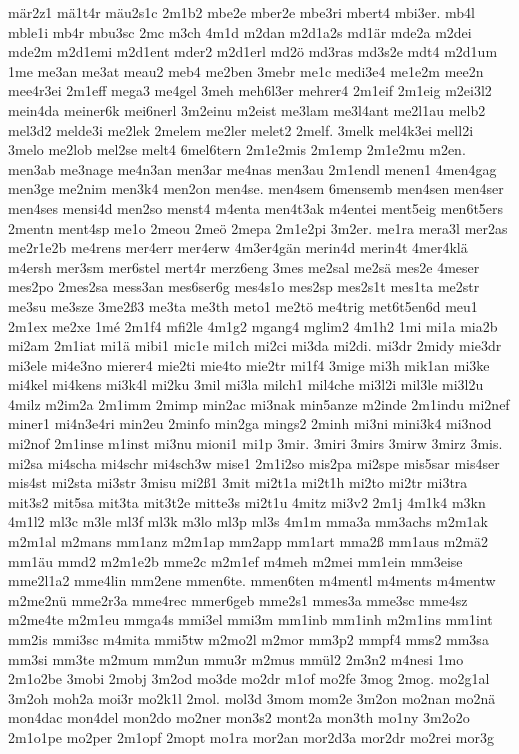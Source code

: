 {mär2z1
mä1t4r
mäu2s1c
2m1b2
mbe2e
mber2e
mbe3ri
mbert4
mbi3er.
mb4l
mble1i
mb4r
mbu3sc
2mc
m3ch
4m1d
m2dan
m2d1a2s
md1är
mde2a
m2dei
mde2m
m2d1emi
m2d1ent
mder2
m2d1erl
md2ö
md3ras
md3s2e
mdt4
m2d1um
1me
me3an
me3at
meau2
meb4
me2ben
3mebr
me1c
medi3e4
me1e2m
mee2n
mee4r3ei
2m1eff
mega3
me4gel
3meh
meh6l3er
mehrer4
2m1eif
2m1eig
m2ei3l2
mein4da
meiner6k
mei6nerl
3m2einu
m2eist
me3lam
me3l4ant
me2l1au
melb2
mel3d2
melde3i
me2lek
2melem
me2ler
melet2
2melf.
3melk
mel4k3ei
mell2i
3melo
me2lob
mel2se
melt4
6mel6tern
2m1e2mis
2m1emp
2m1e2mu
m2en.
men3ab
me3nage
me4n3an
men3ar
me4nas
men3au
2m1endl
menen1
4men4gag
men3ge
me2nim
men3k4
men2on
men4se.
men4sem
6mensemb
men4sen
men4ser
men4ses
mensi4d
men2so
menst4
m4enta
men4t3ak
m4entei
ment5eig
men6t5ers
2mentn
ment4sp
me1o
2meou
2meö
2mepa
2m1e2pi
3m2er.
me1ra
mera3l
mer2as
me2r1e2b
me4rens
mer4err
mer4erw
4m3er4gän
merin4d
merin4t
4mer4klä
m4ersh
mer3sm
mer6stel
mert4r
merz6eng
3mes
me2sal
me2sä
mes2e
4meser
mes2po
2mes2sa
mess3an
mes6ser6g
mes4s1o
mes2sp
mes2s1t
mes1ta
me2str
me3su
me3sze
3me2ß3
me3ta
me3th
meto1
me2tö
me4trig
met6t5en6d
meu1
2m1ex
me2xe
1mé
2m1f4
mfi2le
4m1g2
mgang4
mglim2
4m1h2
1mi
mi1a
mia2b
mi2am
2m1iat
mi1ä
mibi1
mic1e
mi1ch
mi2ci
mi3da
mi2di.
mi3dr
2midy
mie3dr
mi3ele
mi4e3no
mierer4
mie2ti
mie4to
mie2tr
mi1f4
3mige
mi3h
mik1an
mi3ke
mi4kel
mi4kens
mi3k4l
mi2ku
3mil
mi3la
milch1
mil4che
mi3l2i
mil3le
mi3l2u
4milz
m2im2a
2m1imm
2mimp
min2ac
mi3nak
min5anze
m2inde
2m1indu
mi2nef
miner1
mi4n3e4ri
min2eu
2minfo
min2ga
mings2
2minh
mi3ni
mini3k4
mi3nod
mi2nof
2m1inse
m1inst
mi3nu
mioni1
mi1p
3mir.
3miri
3mirs
3mirw
3mirz
3mis.
mi2sa
mi4scha
mi4schr
mi4sch3w
mise1
2m1i2so
mis2pa
mi2spe
mis5sar
mis4ser
mis4st
mi2sta
mi3str
3misu
mi2ß1
3mit
mi2t1a
mi2t1h
mi2to
mi2tr
mi3tra
mit3s2
mit5sa
mit3ta
mit3t2e
mitte3s
mi2t1u
4mitz
mi3v2
2m1j
4m1k4
m3kn
4m1l2
ml3c
m3le
ml3f
ml3k
m3lo
ml3p
ml3s
4m1m
mma3a
mm3achs
m2m1ak
m2m1al
m2mans
mm1anz
m2m1ap
mm2app
mm1art
mma2ß
mm1aus
m2mä2
mm1äu
mmd2
m2m1e2b
mme2c
m2m1ef
m4meh
m2mei
mm1ein
mm3eise
mme2l1a2
mme4lin
mm2ene
mmen6te.
mmen6ten
m4mentl
m4ments
m4mentw
m2me2nü
mme2r3a
mme4rec
mmer6geb
mme2s1
mmes3a
mme3sc
mme4sz
m2me4te
m2m1eu
mmga4s
mmi3el
mmi3m
mm1inb
mm1inh
m2m1ins
mm1int
mm2is
mmi3sc
m4mita
mmi5tw
m2mo2l
m2mor
mm3p2
mmpf4
mms2
mm3sa
mm3si
mm3te
m2mum
mm2un
mmu3r
m2mus
mmül2
2m3n2
m4nesi
1mo
2m1o2be
3mobi
2mobj
3m2od
mo3de
mo2dr
m1of
mo2fe
3mog
2mog.
mo2g1al
3m2oh
moh2a
moi3r
mo2k1l
2mol.
mol3d
3mom
mom2e
3m2on
mo2nan
mo2nä
mon4dac
mon4del
mon2do
mo2ner
mon3s2
mont2a
mon3th
mo1ny
3m2o2o
2m1o1pe
mo2per
2m1opf
2mopt
mo1ra
mor2an
mor2d3a
mor2dr
mo2rei
mor3g
}
